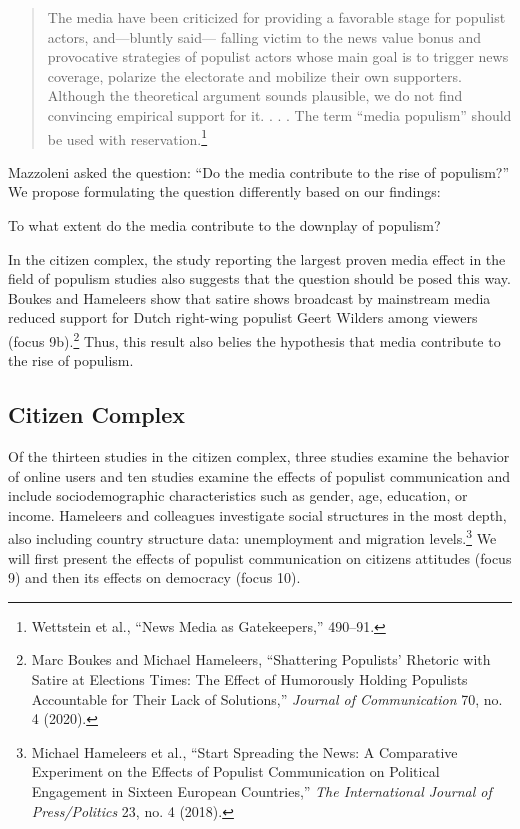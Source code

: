 \documentclass{tufte-handout}
\begin{document}
{{\begin{quote}
The media have been criticized for providing a favorable stage for
populist actors, and---bluntly said--- falling victim to the news value
bonus and provocative strategies of populist actors whose main goal is
to trigger news coverage, polarize the electorate and mobilize their own
supporters. Although the theoretical argument sounds plausible, we do
not find convincing empirical support for it. . . . The term ``media
populism'' should be used with reservation.\footnote{Wettstein et al.,
  ``News Media as Gatekeepers,'' 490--91.}
\end{quote}

\noindent Mazzoleni asked the question: ``Do the media contribute to the rise of
populism?'' We propose formulating the question differently based on our
findings:

To what extent do the media contribute to the downplay of populism?

In the citizen complex, the study reporting the largest proven media
effect in the field of populism studies also suggests that the question
should be posed this way. Boukes and Hameleers show that satire shows
broadcast by mainstream media reduced support for Dutch right-wing
populist Geert Wilders among viewers (focus 9b).\footnote{Marc Boukes
  and Michael Hameleers, ``Shattering Populists' Rhetoric with Satire at
  Elections Times: The Effect of Humorously Holding Populists
  Accountable for Their Lack of Solutions,'' \emph{Journal of
  Communication} 70, no. 4 (2020).} Thus, this result also belies the
hypothesis that media contribute to the rise of populism.

\hypertarget{citizen-complex}{%
\subsection{Citizen Complex}
}\label{citizen-complex}

Of the thirteen studies in the citizen complex, three studies examine
the behavior of online users and ten studies examine the effects of
populist communication and include sociodemographic characteristics such
as gender, age, education, or income. Hameleers and colleagues
investigate social structures in the most depth, also including country
structure data: unemployment and migration levels.\footnote{Michael
  Hameleers et al., ``Start Spreading the News: A Comparative Experiment
  on the Effects of Populist Communication on Political Engagement in
  Sixteen European Countries,'' \emph{The International Journal of
  Press/Politics} 23, no. 4 (2018).} We will first present the effects
of populist communication on citizens\textquotesingle{} attitudes (focus
9) and then its effects on democracy (focus 10).

}}
\end{document}
